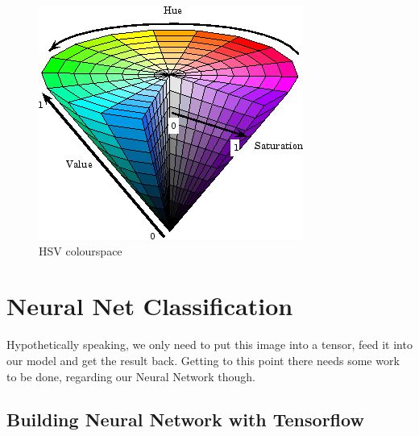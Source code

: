 \begin{figure}[H]
	\centering
	\includegraphics[width=\linewidth]{images/hsv.jpg}
	\caption{HSV colourspace \cite{hsv}}\label{fig:hsv}
	\endminipage\hfill
\end{figure}



\section{Neural Net Classification}
Hypothetically speaking, we only need to put this image into a tensor, feed it into our model and get the result back. Getting to this point there needs some work to be done, regarding our Neural Network though.  
\subsection{Building Neural Network with Tensorflow}
